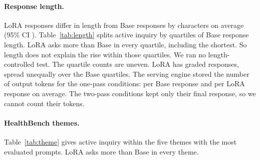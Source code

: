 \documentclass{article}
\begin{document}
\paragraph{Response length.} LoRA responses differ in length from Base responses by
\statHBMedGemmaMayCharsLoRAvsBaseDiff{} characters on average (95\% CI \statHBMedGemmaMayCharsLoRAvsBaseCI).
Table~\ref{tab:length} splits active inquiry by quartiles of Base response length. LoRA asks more
than Base in every quartile, including the shortest. So length does not explain the rise within
those quartiles. We ran no length-controlled test. The quartile counts are uneven. LoRA has
\statHBMedGemmaMayScoredLoRA{} graded responses, spread unequally over the Base quartiles. The serving engine
stored the number of output tokens for the one-pass conditions: \statHBMedGemmaMayTokensEngineBase{} per Base
response and \statHBMedGemmaMayTokensEngineLoRA{} per LoRA response on average. The two-pass conditions kept
only their final response, so we cannot count their tokens.

\begin{table}[!ht]
\centering
\small
\caption{Active-inquiry rate (\%) by quartile of response length, over pooled graded responses.
The quartile edges come from the Base condition. Q1 is below \statHBMedGemmaMayLengthQuartileBoundA{}
characters, Q2 from \statHBMedGemmaMayLengthQuartileBoundA{} to below \statHBMedGemmaMayLengthQuartileBoundB, Q3 from
\statHBMedGemmaMayLengthQuartileBoundB{} to below \statHBMedGemmaMayLengthQuartileBoundC, and Q4 at
\statHBMedGemmaMayLengthQuartileBoundC{} or more. Overall is the pooled rate, so it can differ in the last
digit from the mean of seed means in Table~\ref{tab:epistemic}. The lower block gives the number
of responses in each quartile.}
\label{tab:length}

\end{table}

\paragraph{HealthBench themes.} Table~\ref{tab:theme} gives active inquiry within the five themes
with the most evaluated prompts. LoRA asks more than Base in every theme.

\begin{table}[!ht]
\centering
\small
\caption{Active-inquiry rate (\%) by HealthBench theme tag, pooled over the five seeds. $n$
prompts counts the unique evaluated prompts with that theme.}
\label{tab:theme}

\end{table}
\end{document}
